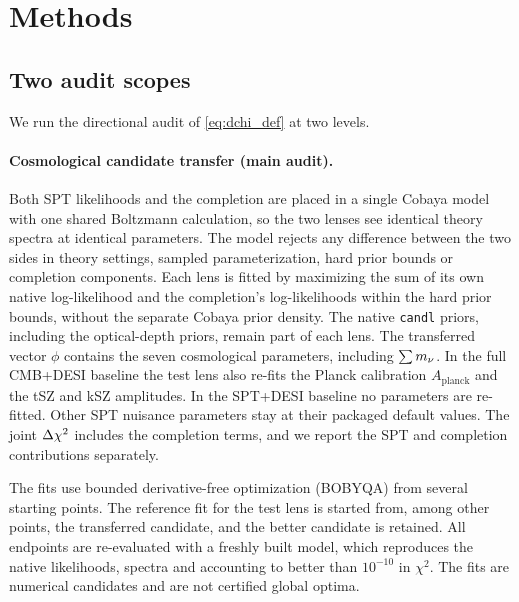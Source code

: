 \section{Methods}
\label{sec:methods}

\subsection{Two audit scopes}
\label{sec:audit-metrics}

We run the directional audit of \cref{eq:dchi_def} at two levels.

\paragraph{Cosmological candidate transfer (main audit).}
Both SPT likelihoods and the completion are placed in a single Cobaya model with one shared Boltzmann calculation, so the two lenses see identical theory spectra at identical parameters. The model rejects any difference between the two sides in theory settings, sampled parameterization, hard prior bounds or completion components. Each lens is fitted by maximizing the sum of its own native log-likelihood and the completion's log-likelihoods within the hard prior bounds, without the separate Cobaya prior density. The native \texttt{candl} priors, including the optical-depth priors, remain part of each lens. The transferred vector $\phi$ contains the seven cosmological parameters, including $\sum m_\nu$. In the full CMB+DESI baseline the test lens also re-fits the Planck calibration $A_{\mathrm{planck}}$ and the tSZ and kSZ amplitudes. In the SPT+DESI baseline no parameters are re-fitted. Other SPT nuisance parameters stay at their packaged default values. The joint $\Delta \chi^2$ includes the completion terms, and we report the SPT and completion contributions separately.

The fits use bounded derivative-free optimization (BOBYQA) from several starting points. The reference fit for the test lens is started from, among other points, the transferred candidate, and the better candidate is retained. All endpoints are re-evaluated with a freshly built model, which reproduces the native likelihoods, spectra and accounting to better than $10^{-10}$ in $\chi^2$. The fits are numerical candidates and are not certified global optima.

